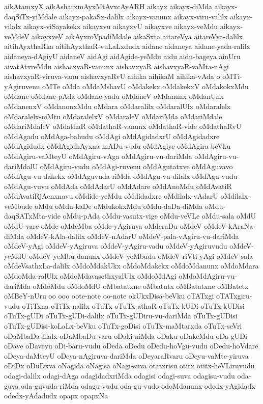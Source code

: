 {aikAtamxyX
aikAsharxmAyxMtAvxcAyARH
aikayx
aikayx-diMda
aikayx-daqSiTx-yiMdale
aikayx-pakaSx-dalilx
aikayx-vanunx
aikayx-viru-valilx
aikayx-vilalx
aikayx-viSayakekx
aikayxvu
aikayxvU
aikayxve
aikayx-veMdu
aikayx-veMdeV
aikayxveV
aikAyxroVpadiMdale
aikaSxta
aitareVya
aitareVya-dalilx
aitihAyxthaRka
aitihAyxthaR-vuLaLxdudx
aidane
aidaneya
aidane-yada-ralilx
aidaneya-dAgiyU
aidaneV
aidAgi
aidAgide-yeMdu
aidu
aidu-bageya
ainUru
aivatAtxreMdu
aishacxyaR-vanunx
aishavxyaR
aishavxyaR-vaMta-nAgi
aishavxyaR-viruva-vanu
aishavxyaRvU
aihika
aihikaM
aihika-vAda
o
oMTi-yAgiruvenu
oMTe
oMda
oMdaMshavU
oMdakekx
oMdakekxV
oMdakokxMdu
oMdane
oMdane-pAda
oMdane-yadu
oMdaneV
oMdanunx
oMdanUnx
oMdanenxV
oMdanonxMdu
oMdara
oMdaralilx
oMdaralUlx
oMdaralelx
oMdaralelx-niMtu
oMdaralelxV
oMdaraleV
oMdariMda
oMdariMdale
oMdariMdaleV
oMdathaR
oMdathaR-vanunx
oMdathaR-vide
oMdathaRvU
oMdAgadu
oMdAga-bahudu
oMdAgi
oMdAgidadxrU
oMdAgidadxre
oMdAgidudx
oMdAgidhAyxna-mADu-vudu
oMdAgiye
oMdAgira-beVku
oMdAgiru-vaMteyU
oMdAgiru-vAga
oMdAgiru-vu-dariMda
oMdAgiru-vu-dariMdalU
oMdAgiru-vudu
oMdAgi-ruvenu
oMdAgutatxve
oMdAguvavo
oMdAgu-vu-dakekx
oMdAguvuda-riMda
oMdAgu-vu-dilalx
oMdAgu-vudu
oMdAgu-vuvu
oMdAda
oMdAdarU
oMdAdare
oMdAnoMdu
oMdAvatiR
oMdAvatiRjAcnxnavu
oMdide-yeMdu
oMdidadxre
oMdilalx-vAdarU
oMdilalx-veMbude
oMdu
oMdu-kaDe
oMdukokxMdu
oMdu-daDa-diMda
oMdu-daqSATxMta-vide
oMdu-pAda
oMdu-vasutx-vige
oMdu-veVLe
oMdu-sala
oMdU
oMdU-vare
oMde
oMdeMba
oMde-yAgiruva
oMderaDu
oMdeV
oMdeV-kAraNa-diMda
oMdeV-kAla-dalilx
oMdeV-nAdarU
oMdeV-pala-vAgiru-vu-dariMda
oMdeV-yAgi
oMdeV-yAgiruva
oMdeV-yAgiru-vadu
oMdeV-yAgiruvudu
oMdeV-yeMdU
oMdeV-yeMbu-danunx
oMdeV-yeMbudu
oMdeV-riVti-yAgi
oMdeV-sala
oMdeVsathxLa-dalilx
oMdoMdakUkx
oMdoMdakekx
oMdoMdanunx
oMdoMdara
oMdoMda-ralUlx
oMdoMdavasethxyalUlx
oMdoMdAgi
oMdoMdAgiru-vu-dariMda
oMdoMdu
oMdoMdU
oMbatatxne
oMbatutx
oMBatatxne
oMBatetx
oMBeY-nUru
oo
ooo
oote-note
oo-note
okUkxDisa-beVku
oTATxgi
oTATxgiru-vudu
oTiTxna
oTiTx-nalilx
oTuTx
oTuTx-athaR
oTuTx-kUDi
oTuTx-kUDisi
oTuTx-gUDi
oTuTx-gUDi-dalilx
oTuTx-gUDiru-vu-dariMda
oTuTx-gUDisi
oTuTx-gUDisi-koLaLx-beVku
oTuTx-goDisi
oTuTx-maMtarxda
oTuTx-seVri
oDaMbaDa-lilalx
oDaMbaDu-varu
oDaki-niMda
oDaku
oDakeMdu
oDa-gUDi
oDave
oDaveyu
oDi-baru-vudu
oDeda
oDedu
oDedu-hoVgu-vudu
oDedu-hoVdare
oDeya-daMteyU
oDeya-nAgiruva-dariMda
oDeyaraRvaru
oDeyu-vaMte-yiruva
oDiDx
oDuDxva
oNagida
oNagisa
oNagi-suva
otatxrisu
otitx
otitx-heVLiruvudu
odagi-dalilx
odagi-dAga
odagidadxriMda
odagisi
odagi-suva
odagisu-vudu
oda-guva
oda-guvuda-riMda
odagu-vudu
oda-gu-vudo
odoMdanunx
odedx-yAgidadx
odedx-yAdadudx
opapx
opapxNa
}
